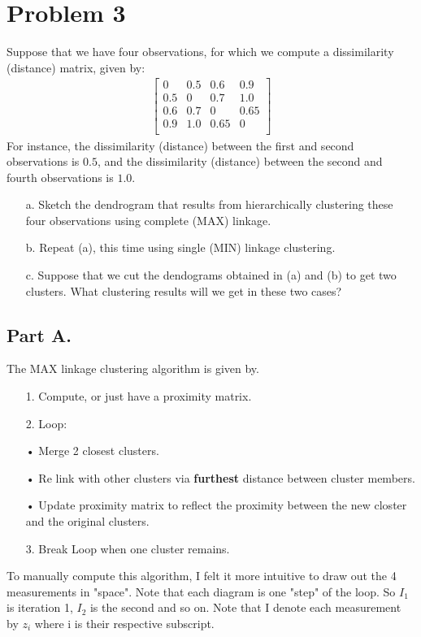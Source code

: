 \documentclass{article}
\begin{document}
\clearpage

\section*{Problem 3}
Suppose that we have four observations, for which we compute a dissimilarity (distance) matrix, given by:
\begin{align*}
\begin{bmatrix}
 0   & 0.5 & 0.6  & 0.9  \\
 0.5 &  0  & 0.7  & 1.0  \\
 0.6 & 0.7 &  0   & 0.65 \\
 0.9 & 1.0 & 0.65 &  0   \\
\end{bmatrix}
\end{align*}
For instance, the dissimilarity (distance) between the first and second observations is $0.5$, and the dissimilarity (distance) between the second and fourth observations is $1.0$.
\begin{enumerate}
\item[a.] Sketch the dendrogram that results from hierarchically clustering these four observations using complete (MAX) linkage.
\item[b.] Repeat (a), this time using single (MIN) linkage clustering.
\item[c.] Suppose that we cut the dendograms obtained in (a) and (b) to get two clusters. What
clustering results will we get in these two cases?
\end{enumerate}
\subsection*{Part A.}
The MAX linkage clustering algorithm is given by.
\begin{enumerate}
\item[1.] Compute, or just have a proximity matrix.
\item[2.] Loop:
\item[•] Merge 2 closest clusters.
\item[•] Re link with other clusters via \textbf{furthest} distance between cluster members.
\item[•] Update proximity matrix to reflect the proximity between the new closter and the original clusters.
\item[3.] Break Loop when one cluster remains.
\end{enumerate}
To manually compute this algorithm, I felt it more intuitive to draw out the 4 measurements in "space". Note that each diagram is one "step" of the loop. So $I_1$ is iteration 1, $I_2$ is the second and so on. Note that I denote each measurement by $z_i$ where i is their respective subscript.
\end{document}
